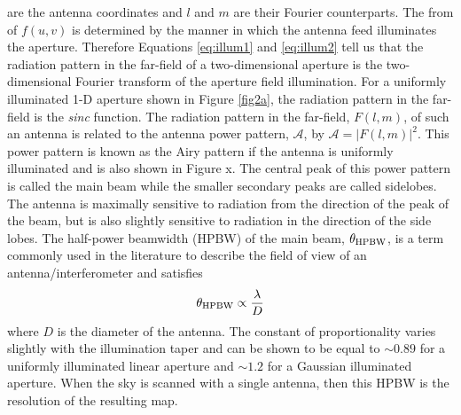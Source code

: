 are the antenna coordinates and $l$ and $m$ are their Fourier counterparts. The from of $f(u,v)$ is determined by the manner in which the antenna feed illuminates the aperture. Therefore Equations \ref{eq:illum1} and \ref{eq:illum2} tell us that the radiation pattern in the far-field of a two-dimensional aperture is the two-dimensional Fourier transform of the aperture field illumination. For a uniformly illuminated 1-D aperture shown in Figure \ref{fig2a}, the radiation pattern in the far-field is the \textit{sinc} function. The radiation pattern in the far-field, $F(l,m)$, of such an antenna is related to the antenna power pattern, $\mathcal{A}$, by $\mathcal{A}=|F(l,m)|^2$. This power pattern is known as the Airy pattern if the antenna is uniformly illuminated and is also shown in Figure x. The central peak of this power pattern is called the main beam while the smaller secondary peaks are called sidelobes. The antenna is maximally sensitive to radiation from the direction of the peak of the beam, but is also slightly sensitive to radiation in the direction of the side lobes. The half-power beamwidth (HPBW) of the main beam, $\theta_{\rm{HPBW}}$, is a term commonly used in the literature to describe the field of view of an antenna/interferometer and satisfies 
\begin{equation}
\theta_{\rm{HPBW}} \propto \frac{\lambda}{D}
\end{equation}
where $D$ is the diameter of the antenna. The constant of proportionality varies slightly with the illumination taper and can be shown to be equal to $\sim 0.89$ for a uniformly illuminated linear aperture and $\sim 1.2$ for a Gaussian illuminated aperture. When the sky is scanned with a single antenna, then this HPBW is the resolution of the resulting map. 

